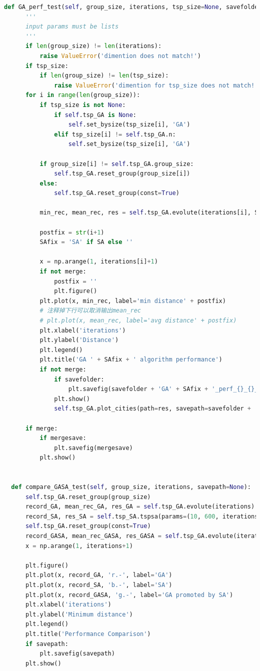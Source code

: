\documentclass[12pt]{article}
\begin{document}
\begin{lstlisting}[language = Python, caption = 测试模块代码]
  def GA_perf_test(self, group_size, iterations, tsp_size=None, savefolder=None, merge=False, mergesave=None, SA=False):
      '''
      input params must be lists
      '''
      if len(group_size) != len(iterations):
          raise ValueError('dimention does not match!')
      if tsp_size:
          if len(group_size) != len(tsp_size):
              raise ValueError('dimention for tsp_size does not match!')
      for i in range(len(group_size)):
          if tsp_size is not None:
              if self.tsp_GA is None: 
                  self.set_bysize(tsp_size[i], 'GA')
              elif tsp_size[i] != self.tsp_GA.n:
                  self.set_bysize(tsp_size[i], 'GA')
                  
          if group_size[i] != self.tsp_GA.group_size:
              self.tsp_GA.reset_group(group_size[i]) 
          else:
              self.tsp_GA.reset_group(const=True)

          min_rec, mean_rec, res = self.tsp_GA.evolute(iterations[i], SA=SA)
          
          postfix = str(i+1)
          SAfix = 'SA' if SA else ''

          x = np.arange(1, iterations[i]+1)  
          if not merge:  
              postfix = ''       
              plt.figure()
          plt.plot(x, min_rec, label='min distance' + postfix)
          # 注释掉下行可以取消输出mean_rec
          # plt.plot(x, mean_rec, label='avg distance' + postfix)
          plt.xlabel('iterations')
          plt.ylabel('Distance')
          plt.legend()
          plt.title('GA ' + SAfix + ' algorithm performance')
          if not merge:
              if savefolder:
                  plt.savefig(savefolder + 'GA' + SAfix + '_perf_{}_{}_{}.jpg'.format(tsp_size[i], group_size[i], iterations[i]))
              plt.show()
              self.tsp_GA.plot_cities(path=res, savepath=savefolder + 'GA' + SAfix + '_res_{}_{}_{}.jpg'.format(tsp_size[i], group_size[i], iterations[i]) if savefolder else None)

      if merge:
          if mergesave:
              plt.savefig(mergesave)
          plt.show()


  def compare_GASA_test(self, group_size, iterations, savepath=None):
      self.tsp_GA.reset_group(group_size)
      record_GA, mean_rec_GA, res_GA = self.tsp_GA.evolute(iterations)
      record_SA, res_SA = self.tsp_SA.tspsa(params=(10, 600, iterations))
      self.tsp_GA.reset_group(const=True)
      record_GASA, mean_rec_GASA, res_GASA = self.tsp_GA.evolute(iterations, SA=True)
      x = np.arange(1, iterations+1)

      plt.figure()
      plt.plot(x, record_GA, 'r.-', label='GA')
      plt.plot(x, record_SA, 'b.-', label='SA')
      plt.plot(x, record_GASA, 'g.-', label='GA promoted by SA')
      plt.xlabel('iterations')
      plt.ylabel('Minimum distance')
      plt.legend()
      plt.title('Performance Comparison')
      if savepath:
          plt.savefig(savepath)
      plt.show()
\end{lstlisting}
\end{document}
